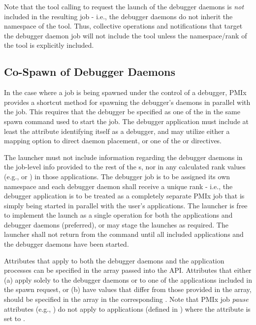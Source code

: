 \adviceuserstart
Note that the tool calling  to request the launch of the debugger daemons is \emph{not} included in the resulting job - i.e., the debugger daemons do not inherit the namespace of the tool. Thus, collective operations and notifications that target the debugger daemon job will not include the tool unless the namespace/rank of the tool is explicitly included.
\adviceuserend

\subsection{Co-Spawn of Debugger Daemons}
\label{chap:api_tools:cospawn}

In the case where a job is being spawned under the control of a debugger, \ac{PMIx} provides a shortcut method for spawning the debugger's daemons in parallel with the job. This requires that the debugger be specified as one of the  in the same spawn command used to start the job. The debugger application must include at least the  attribute identifying itself as a debugger, and may utilize either a mapping option to direct daemon placement, or one of the  or  directives.

The launcher must not include information regarding the debugger daemons in
the job-level info
provided to the rest of the s, nor in any calculated rank
values (e.g.,  or ) in those applications. The
debugger job is to be assigned its own namespace and each debugger daemon shall
receive a unique rank - i.e., the debugger application is to be treated as a
completely separate \ac{PMIx} job that is simply being started in parallel with
the user's applications. The launcher is free to implement the launch as a
single operation for both the applications and debugger daemons (preferred), or
may stage the launches as required. The launcher shall not return from the
 command until all included applications and the debugger
daemons have been started.

Attributes that apply to both the debugger daemons and the application processes can
be specified in the  array passed into the
 \ac{API}. Attributes that either (a) apply solely to the
debugger daemons or to one of the applications included in the spawn request,
or (b) have values that differ from those provided in the 
array, should be specified in the  array in the corresponding
.
Note that \ac{PMIx} job \emph{pause} attributes (e.g., ) do not apply to applications (defined in ) where the  attribute is set to .

